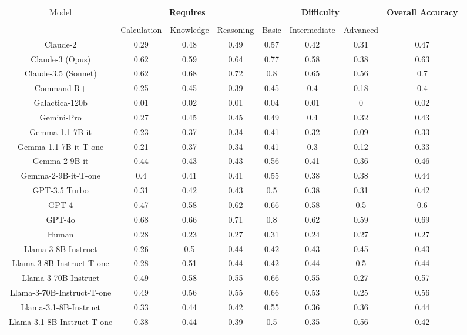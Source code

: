 \begin{tabular}{cccccccc}
\toprule
\multirow{3}{*}{Model} & \multicolumn{3}{c}{\textbf{Requires}} & \multicolumn{3}{c}{\textbf{Difficulty}} & \multirow{3}{*}{\textbf{Overall Accuracy}}\\\cmidrule(lr){2-4} \cmidrule(lr){5-7}\\
 & Calculation & Knowledge & Reasoning & Basic & Intermediate & Advanced &  \\
\midrule
Claude-2 & 0.29 & 0.48 & 0.49 & 0.57 & 0.42 & 0.31 & 0.47 \\
Claude-3 (Opus) & 0.62 & 0.59 & 0.64 & 0.77 & 0.58 & 0.38 & 0.63 \\
Claude-3.5 (Sonnet) & 0.62 & 0.68 & 0.72 & 0.8 & 0.65 & 0.56 & 0.7 \\
Command-R+ & 0.25 & 0.45 & 0.39 & 0.45 & 0.4 & 0.18 & 0.4 \\
Galactica-120b & 0.01 & 0.02 & 0.01 & 0.04 & 0.01 & 0 & 0.02 \\
Gemini-Pro & 0.27 & 0.45 & 0.45 & 0.49 & 0.4 & 0.32 & 0.43 \\
Gemma-1.1-7B-it & 0.23 & 0.37 & 0.34 & 0.41 & 0.32 & 0.09 & 0.33 \\
Gemma-1.1-7B-it-T-one & 0.21 & 0.37 & 0.34 & 0.41 & 0.3 & 0.12 & 0.33 \\
Gemma-2-9B-it & 0.44 & 0.43 & 0.43 & 0.56 & 0.41 & 0.36 & 0.46 \\
Gemma-2-9B-it-T-one & 0.4 & 0.41 & 0.41 & 0.55 & 0.38 & 0.38 & 0.44 \\
GPT-3.5 Turbo & 0.31 & 0.42 & 0.43 & 0.5 & 0.38 & 0.31 & 0.42 \\
GPT-4 & 0.47 & 0.58 & 0.62 & 0.66 & 0.58 & 0.5 & 0.6 \\
GPT-4o & 0.68 & 0.66 & 0.71 & 0.8 & 0.62 & 0.59 & 0.69 \\
Human & 0.28 & 0.23 & 0.27 & 0.31 & 0.24 & 0.27 & 0.27 \\
Llama-3-8B-Instruct & 0.26 & 0.5 & 0.44 & 0.42 & 0.43 & 0.45 & 0.43 \\
Llama-3-8B-Instruct-T-one & 0.28 & 0.51 & 0.44 & 0.42 & 0.44 & 0.5 & 0.44 \\
Llama-3-70B-Instruct & 0.49 & 0.58 & 0.55 & 0.66 & 0.55 & 0.27 & 0.57 \\
Llama-3-70B-Instruct-T-one & 0.49 & 0.56 & 0.55 & 0.66 & 0.53 & 0.25 & 0.56 \\
Llama-3.1-8B-Instruct & 0.33 & 0.44 & 0.42 & 0.55 & 0.36 & 0.36 & 0.44 \\
Llama-3.1-8B-Instruct-T-one & 0.38 & 0.44 & 0.39 & 0.5 & 0.35 & 0.56 & 0.42 \\

\end{tabular}
